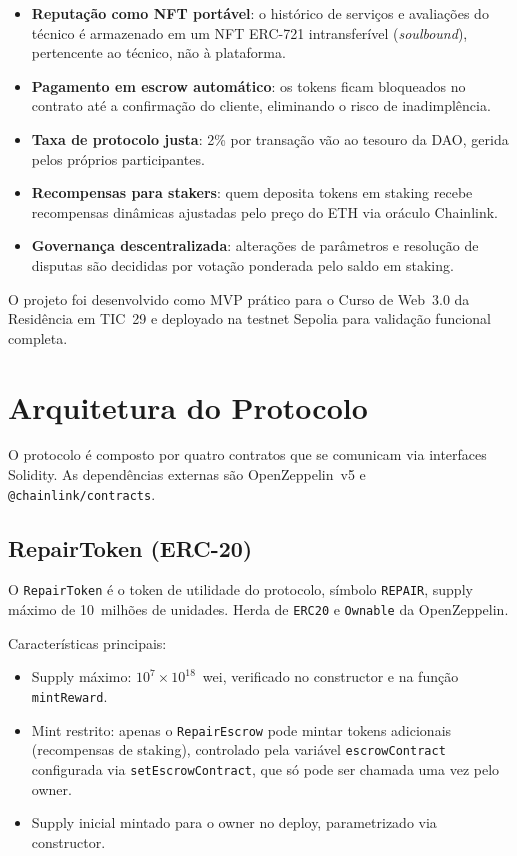 \documentclass[
    12pt,
    a4paper,
    oneside,
    brazil,
    sumario=tradicional
]{abntex2}
\begin{document}
\begin{itemize}
    \item \textbf{Reputação como NFT portável}: o histórico de
    serviços e avaliações do técnico é armazenado em um NFT
    ERC-721 intransferível (\textit{soulbound}), pertencente ao técnico,
    não à plataforma.

    \item \textbf{Pagamento em escrow automático}: os tokens ficam
    bloqueados no contrato até a confirmação do cliente, eliminando o
    risco de inadimplência.

    \item \textbf{Taxa de protocolo justa}: 2\% por transação vão ao
    tesouro da DAO, gerida pelos próprios participantes.

    \item \textbf{Recompensas para stakers}: quem deposita tokens em staking
    recebe recompensas dinâmicas ajustadas pelo preço do ETH via
    oráculo Chainlink.

    \item \textbf{Governança descentralizada}: alterações de
    parâmetros e resolução de disputas são decididas por
    votação ponderada pelo saldo em staking.
\end{itemize}

O projeto foi desenvolvido como MVP prático para o Curso de Web~3.0
da Residência em TIC~29 e deployado na testnet Sepolia para validação
funcional completa.

\section{Arquitetura do Protocolo}

O protocolo é composto por quatro contratos que se comunicam via interfaces
Solidity. As dependências externas são OpenZeppelin~v5 e
\texttt{@chainlink/contracts}.

\subsection{RepairToken (ERC-20)}

O \texttt{RepairToken} é o token de utilidade do protocolo, símbolo
\texttt{REPAIR}, supply máximo de 10~milhões de unidades. Herda de
\texttt{ERC20} e \texttt{Ownable} da OpenZeppelin.

Características principais:
\begin{itemize}
    \item Supply máximo: $10^7 \times 10^{18}$~wei, verificado no
    constructor e na função \texttt{mintReward}.
    \item Mint restrito: apenas o \texttt{RepairEscrow} pode mintar tokens
    adicionais (recompensas de staking), controlado pela variável
    \texttt{escrowContract} configurada via \texttt{setEscrowContract}, que
    só pode ser chamada uma vez pelo owner.
    \item Supply inicial mintado para o owner no deploy, parametrizado via
    constructor.
\end{itemize}
\end{document}
